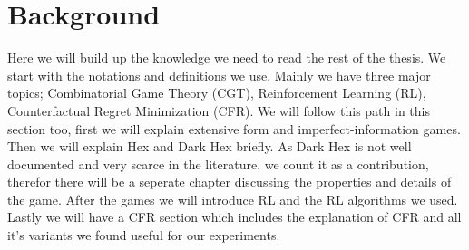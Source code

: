 \section{Background}

Here we will build up the knowledge we need to read the rest of the thesis. We start
with the notations and definitions we use. Mainly we have three major topics; 
Combinatorial Game Theory (CGT), Reinforcement Learning (RL), Counterfactual Regret
Minimization (CFR). We will follow this path in this section too, first we will explain
extensive form and imperfect-information games. Then we will explain Hex and Dark Hex 
briefly. As Dark Hex is not well documented and very scarce in the literature, we count
it as a contribution, therefor there will be a seperate chapter discussing the properties
and details of the game. After the games we will introduce RL and the RL algorithms we used.
Lastly we will have a CFR section which includes the explanation of CFR and all it's variants
we found useful for our experiments.